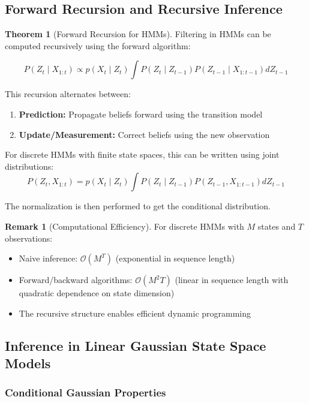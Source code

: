 \documentclass[12pt,a4paper]{article}
\theoremstyle{definition}
\newtheorem{theorem}{Theorem}[section]
\newtheorem{remark}{Remark}[section]
\begin{document}
\subsection{Forward Recursion and Recursive Inference}

\begin{theorem}[Forward Recursion for HMMs]
Filtering in HMMs can be computed recursively using the forward algorithm:

\[
P(Z_t \mid X_{1:t}) \propto p(X_t \mid Z_t) \int P(Z_t \mid Z_{t-1}) P(Z_{t-1} \mid X_{1:t-1}) dZ_{t-1}
\]

This recursion alternates between:
\begin{enumerate}
    \item \textbf{Prediction:} Propagate beliefs forward using the transition model
    \item \textbf{Update/Measurement:} Correct beliefs using the new observation
\end{enumerate}

For discrete HMMs with finite state spaces, this can be written using joint distributions:
\[
P(Z_t, X_{1:t}) = p(X_t \mid Z_t) \int P(Z_t \mid Z_{t-1}) P(Z_{t-1}, X_{1:t-1}) dZ_{t-1}
\]

The normalization is then performed to get the conditional distribution.
\end{theorem}

\begin{remark}[Computational Efficiency]
For discrete HMMs with $M$ states and $T$ observations:
\begin{itemize}
    \item Naive inference: $\mathcal{O}(M^T)$ (exponential in sequence length)
    \item Forward/backward algorithms: $\mathcal{O}(M^2 T)$ (linear in sequence length with quadratic dependence on state dimension)
    \item The recursive structure enables efficient dynamic programming
\end{itemize}
\end{remark}

\newpage


\subsection{Inference in Linear Gaussian State Space Models}

\subsubsection{Conditional Gaussian Properties}
\end{document}
